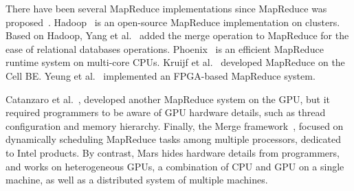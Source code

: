 There have been several MapReduce implementations since MapReduce was proposed~\cite{Dean2008}.
Hadoop~\cite{HADOOP} is an open-source MapReduce implementation on clusters.
Based on Hadoop, Yang et al.~\cite{Yang2007} added the merge operation to MapReduce for the ease of relational databases operations.
Phoenix~\cite{Ranger2007} is an efficient MapReduce runtime system on multi-core CPUs.
Kruijf et al.~\cite{Kruijf2007} developed MapReduce on the Cell BE.
Yeung et al.~\cite{Yeung2008} implemented an FPGA-based MapReduce system.



Catanzaro et al.~\cite{Catanzaro2008}, developed another MapReduce system on the GPU, but it required programmers to be aware of GPU hardware details, such as thread configuration and memory hierarchy.
Finally, the Merge framework~\cite{Linderman2008}, focused on dynamically scheduling MapReduce tasks among multiple processors, dedicated to Intel products.
By contrast, Mars hides hardware details from programmers, and works on heterogeneous GPUs, a combination of CPU and GPU on a single machine, as well as a distributed system of multiple machines.

\newpage
